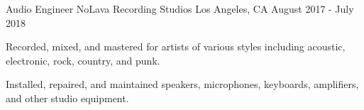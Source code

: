 \begin{cventries}

  \cventry
    {Audio Engineer} %
    {NoLava Recording Studios} %
    {Los Angeles, CA} %
    {August 2017 - July 2018} %
    {
      \begin{cvitems} %
        \item {Recorded, mixed, and mastered for artists of various styles including acoustic, electronic, rock, country, and punk.}
        \item {Installed, repaired, and maintained speakers, microphones, keyboards, amplifiers, and other studio equipment.}
      \end{cvitems}
    }

\end{cventries}
